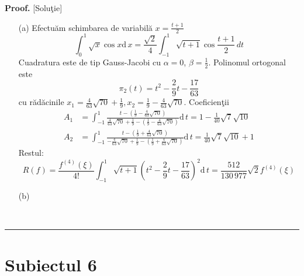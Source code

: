 \documentclass[12pt]{article}%
\newenvironment{proof}[1][Proof]{\noindent\textbf{#1.} }{\ \rule{0.5em}{0.5em}}
\begin{document}
\begin{proof}
[Solu\c{t}ie]

\begin{enumerate}
\item[(a)] Efectu\u{a}m schimbarea de variabil\u{a} $x=\frac{t+1}{2}$%
\[
\int_{0}^{1}\sqrt{x}\cos x\mathrm{d}\,x=\frac{\sqrt{2}}{4}\int_{-1}^{1}%
\sqrt{t+1}\cos\frac{t+1}{2}\,dt
\]
Cuadratura este de tip Gauss-Jacobi cu $\alpha=0$, $\beta=\frac{1}{2}$.
Polinomul ortogonal este%
\[
\pi_{2}(t)=t^{2}-\frac{2}{9}t-\frac{17}{63}%
\]
cu r\u{a}d\u{a}cinile $x_{1}=\frac{4}{63}\sqrt{70}+\frac{1}{9},x_{2}=\frac
{1}{9}-\frac{4}{63}\sqrt{70}$. Coeficien\c{t}ii%
\begin{align*}
A_{1}  & =\int_{-1}^{1}\frac{t-\left(  \frac{1}{9}-\frac{4}{63}\sqrt
{70}\right)  }{\frac{4}{63}\sqrt{70}+\frac{1}{9}-\left(  \frac{1}{9}-\frac
{4}{63}\sqrt{70}\right)  }\mathrm{d}\,t=1-\frac{1}{40}\sqrt{7}\sqrt{10}\\
A_{2}  & =\int_{-1}^{1}\frac{t-\left(  \frac{1}{9}+\frac{4}{63}\sqrt
{70}\right)  }{-\frac{4}{63}\sqrt{70}+\frac{1}{9}-\left(  \frac{1}{9}+\frac
{4}{63}\sqrt{70}\right)  }\mathrm{d}\,t=\frac{1}{40}\sqrt{7}\sqrt{10}+1
\end{align*}
Restul:%
\[
R(f)=\frac{f^{(4)}(\xi)}{4!}\int_{-1}^{1}\sqrt{t+1}\left(  t^{2}-\frac{2}%
{9}t-\frac{17}{63}\right)  ^{2}\mathrm{d}\,t=\frac{512}{130\,977}\sqrt
{2}f^{\left(  4\right)  }\left(  \xi\right)
\]


\item[(b)] 
\end{enumerate}
\end{proof}

\section*{Subiectul 6}
\end{document}
